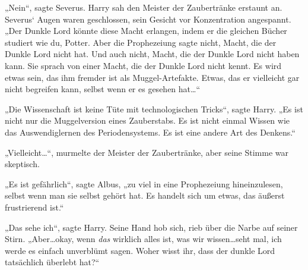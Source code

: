 

„Nein“, sagte Severus. Harry sah den Meister der Zaubertränke erstaunt an. Severus‘ Augen waren geschlossen, sein Gesicht vor Konzentration angespannt. „Der Dunkle Lord könnte diese Macht erlangen, indem er die gleichen Bücher studiert wie du, Potter. Aber die Prophezeiung sagte nicht, Macht, die der Dunkle Lord nicht hat. Und auch nicht, Macht, die der Dunkle Lord nicht haben kann. Sie sprach von einer Macht, die der Dunkle Lord nicht kennt. Es wird etwas sein, das ihm fremder ist als Muggel-Artefakte. Etwas, das er vielleicht gar nicht begreifen kann, selbst wenn er es gesehen hat…“

„Die Wissenschaft ist keine Tüte mit technologischen Tricks“, sagte Harry. „Es ist nicht nur die Muggelversion eines Zauberstabs. Es ist nicht einmal Wissen wie das Auswendiglernen des Periodensystems. Es ist eine andere Art des Denkens.“

„Vielleicht…“, murmelte der Meister der Zaubertränke, aber seine Stimme war skeptisch.

„Es ist gefährlich“, sagte Albus, „zu viel in eine Prophezeiung hineinzulesen, selbst wenn man sie selbst gehört hat. Es handelt sich um etwas, das äußerst frustrierend ist.“

„Das sehe ich“, sagte Harry. Seine Hand hob sich, rieb über die Narbe auf seiner Stirn. „Aber…okay, wenn \emph{das} wirklich alles ist, was wir wissen…seht mal, ich werde es einfach unverblümt sagen. Woher wisst ihr, dass der dunkle Lord tatsächlich überlebt hat?“

